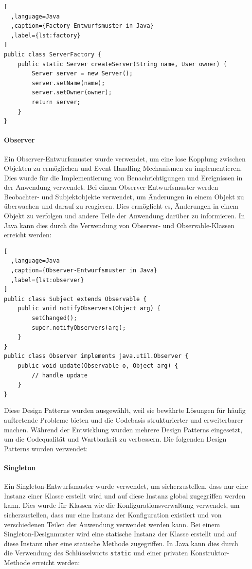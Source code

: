 \begin{lstlisting}[
  ,language=Java
  ,caption={Factory-Entwurfsmuster in Java}
  ,label={lst:factory}
]
public class ServerFactory {
    public static Server createServer(String name, User owner) {
        Server server = new Server();
        server.setName(name);
        server.setOwner(owner);
        return server;
    }
}
\end{lstlisting}

\paragraph{Observer}\label{observer} Ein Observer-Entwurfsmuster wurde verwendet, um eine lose Kopplung zwischen Objekten zu ermöglichen und Event-Handling-Mechanismen zu implementieren. Dies wurde für die Implementierung von Benachrichtigungen und Ereignissen in der Anwendung verwendet. Bei einem Observer-Entwurfsmuster werden Beobachter- und Subjektobjekte verwendet, um Änderungen in einem Objekt zu überwachen und darauf zu reagieren. Dies ermöglicht es, Änderungen in einem Objekt zu verfolgen und andere Teile der Anwendung darüber zu informieren. In Java kann dies durch die Verwendung von Observer- und Observable-Klassen erreicht werden:


\begin{lstlisting}[
  ,language=Java
  ,caption={Observer-Entwurfsmuster in Java}
  ,label={lst:observer}
]
public class Subject extends Observable {
    public void notifyObservers(Object arg) {
        setChanged();
        super.notifyObservers(arg);
    }
}
public class Observer implements java.util.Observer {
    public void update(Observable o, Object arg) {
        // handle update
    }
}
\end{lstlisting}

Diese Design Patterns wurden ausgewählt, weil sie bewährte Lösungen für häufig auftretende Probleme bieten und die Codebasis strukturierter und erweiterbarer machen.
Während der Entwicklung wurden mehrere \gls{Design Patterns} eingesetzt, um die Codequalität und Wartbarkeit zu verbessern. Die folgenden Design Patterns wurden verwendet:

\paragraph{Singleton}\label{singleton} Ein Singleton-Entwurfsmuster wurde verwendet, um sicherzustellen, dass nur eine Instanz einer Klasse erstellt wird und auf diese Instanz global zugegriffen werden kann. Dies wurde für Klassen wie die Konfigurationsverwaltung verwendet, um sicherzustellen, dass nur eine Instanz der Konfiguration existiert und von verschiedenen Teilen der Anwendung verwendet werden kann. Bei einem Singleton-Designmuster wird eine statische Instanz der Klasse erstellt und auf diese Instanz über eine statische Methode zugegriffen. In Java kann dies durch die Verwendung des Schlüsselworts \texttt{static} und einer privaten Konstruktor-Methode erreicht werden:

